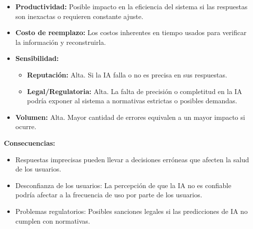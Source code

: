 \documentclass[a4paper,12pt]{article}
\begin{document}
    \begin{itemize}
        \item \textbf{Productividad:} Posible impacto en la eficiencia del sistema si las respuestas son inexactas o requieren constante ajuste.
        \item \textbf{Costo de reemplazo:} Los costos inherentes en tiempo usados para verificar la información y reconstruirla.
        \item \textbf{Sensibilidad:}
        \begin{itemize}
            \item \textbf{Reputación:} Alta. Si la IA falla o no es precisa en sus respuestas.
            \item \textbf{Legal/Regulatoria:} Alta. La falta de precisión o completitud en la IA podría exponer al sistema a normativas estrictas o posibles demandas.
        \end{itemize}
        \item \textbf{Volumen:} Alta. Mayor cantidad de errores equivalen a un mayor impacto si ocurre.
    \end{itemize}
    \par \textbf{Consecuencias:}
    \begin{itemize}
        \item Respuestas imprecisas pueden llevar a decisiones erróneas que afecten la salud de los usuarios.
        \item Desconfianza de los usuarios: La percepción de que la IA no es confiable podría afectar a la frecuencia de uso por parte de los usuarios.
        \item Problemas regulatorios: Posibles sanciones legales si las predicciones de IA no cumplen con normativas.
    \end{itemize}
\end{document}
